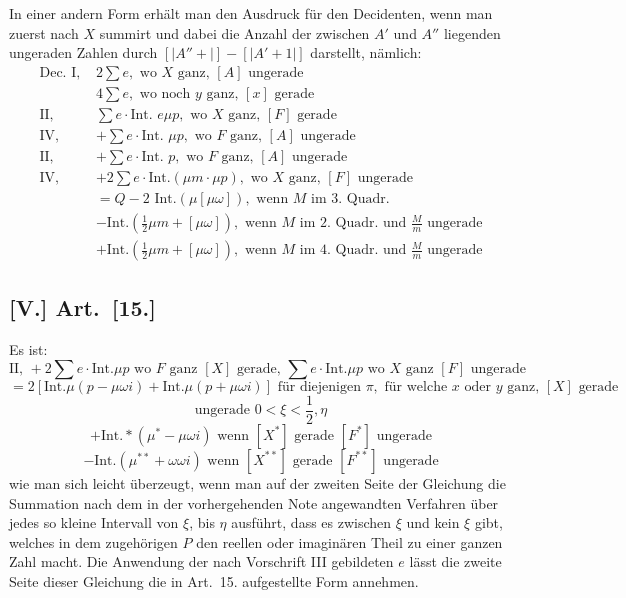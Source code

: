 \documentclass[12pt,a4paper]{article}
\begin{document}
In einer andern Form erhält man den Ausdruck für den Decidenten, wenn man zuerst nach $X$ summirt und dabei die Anzahl der zwischen $A'$ und $A''$ liegenden ungeraden Zahlen durch $[|A'' + |] - [|A' + 1|]$ darstellt, nämlich:
\begin{align*}
\text{Dec. I, } &2\sum e, \text{ wo } X \text{ ganz, } [A] \text{ ungerade}\\
&4\sum e, \text{ wo noch } y \text{ ganz, } [x] \text{ gerade}\\
\text{II, } &\sum e \cdot \text{Int. } e\mu p, \text{ wo } X \text{ ganz, } [F] \text{ gerade}\\
\text{IV, } &+ \sum e \cdot \text{Int. } \mu p, \text{ wo } F \text{ ganz, } [A] \text{ ungerade}\\
\text{II, } &+ \sum e \cdot \text{Int. } p, \text{ wo } F \text{ ganz, } [A] \text{ ungerade}\\
\text{IV, } &+ 2\sum e \cdot \text{Int.}(\mu m \cdot \mu p), \text{ wo } X \text{ ganz, } [F] \text{ ungerade}\\
&= Q - 2 \text{ Int.}(\mu [\mu \omega]), \text{ wenn } M \text{ im 3. Quadr.}\\
&- \text{Int.}(\frac{1}{2}\mu m + [\mu \omega]), \text{ wenn } M \text{ im 2. Quadr. und } \frac{M}{m} \text{ ungerade}\\
&+ \text{Int.}(\frac{1}{2}\mu m + [\mu \omega]), \text{ wenn } M \text{ im 4. Quadr. und } \frac{M}{m} \text{ ungerade}
\end{align*}

\subsection*{[V.] Art.~[15.]}

Es ist:
\[
\text{II, } +2\sum e \cdot \text{Int.}\mu p \text{ wo } F \text{ ganz } [X] \text{ gerade, } \sum e \cdot \text{Int.}\mu p \text{ wo } X \text{ ganz } [F] \text{ ungerade}
\]
\[
= 2[\text{Int.}\mu (p - \mu \omega i) + \text{Int.}\mu (p + \mu \omega i)] \text{ für diejenigen } \pi, \text{ für welche } x \text{ oder } y \text{ ganz, } [X] \text{ gerade}
\]
\[
\text{ungerade } 0 < \xi < \frac{1}{2}, \eta
\]
\[
+ \text{Int.}*(\mu^* - \mu \omega i) \text{ wenn } [X^*] \text{ gerade } [F^*] \text{ ungerade}
\]
\[
- \text{Int.}(\mu^{**} + \omega \omega i) \text{ wenn } [X^{**}] \text{ gerade } [F^{**}] \text{ ungerade}
\]
wie man sich leicht überzeugt, wenn man auf der zweiten Seite der Gleichung die Summation nach dem in der vorhergehenden Note angewandten Verfahren über jedes so kleine Intervall von $\xi$, bis $\eta$ ausführt, dass es zwischen $\xi$ und kein $\xi$ gibt, welches in dem zugehörigen $P$ den reellen oder imaginären Theil zu einer ganzen Zahl macht. Die Anwendung der nach Vorschrift III gebildeten $e$ lässt die zweite Seite dieser Gleichung die in Art.~15. aufgestellte Form annehmen.
\end{document}
